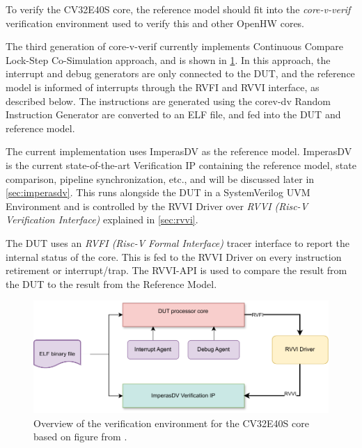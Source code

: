 To verify the CV32E40S core, the reference model should fit into the \textit{core-v-verif} verification environment used to verify this and other OpenHW cores\cite{openhwgroupOpenhwgroupCorevverif2023}.

The third generation of core-v-verif currently implements Continuous Compare Lock-Step Co-Simulation approach\cite{duncangrahamRISCVVerificationImplications2023}, and is shown in \cref{fig:cv32e40s-overview}. In this approach, the interrupt and debug generators are only connected to the DUT, and the reference model is informed of interrupts through the RVFI and RVVI interface, as described below. 
The instructions are generated using the corev-dv Random Instruction Generator are converted to an ELF file, and fed into the DUT and reference model\cite{openhwgroupOpenhwgroupCorevverif2023}.

The current implementation uses ImperasDV as the reference model. ImperasDV is the current state-of-the-art Verification IP containing the reference model, state comparison, pipeline synchronization, etc., and will be discussed later in \cref{sec:imperasdv}. This runs alongside the DUT in a SystemVerilog UVM Environment and is controlled by the RVVI Driver over \textit{RVVI (Risc-V Verification Interface)} \cite{taylorAdvancedRISCVVerification2023} explained in \cref{sec:rvvi}. 

The DUT uses an \textit{RVFI (Risc-V Formal Interface)} tracer interface to report the internal status of the core\cite{symbioticedaRiscvformalDocsRvfi2020}. This is fed to the RVVI Driver on every instruction retirement or interrupt/trap. The RVVI-API is used to compare the result from the DUT to the result from the Reference Model.


\begin{figure}[hbt]
    \centering
    \includegraphics[width=0.75\linewidth]{figures/core-v-verif.pdf}
    \caption{Overview of the verification environment for the CV32E40S core based on figure from \cite{openhwgroupOpenhwgroupCorevverif2023}.}
    \label{fig:cv32e40s-overview}
\end{figure}


